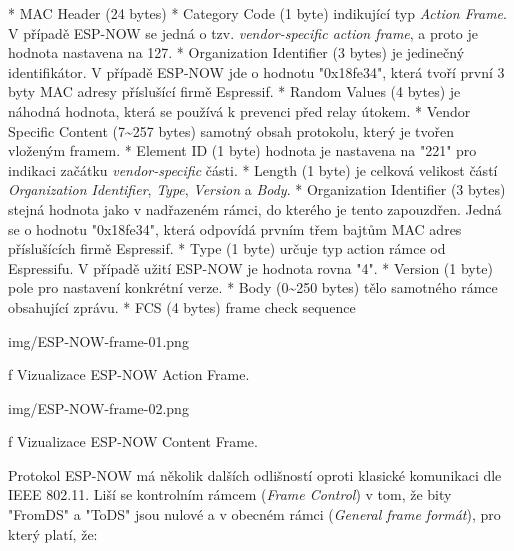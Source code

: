 \begitems
* {\sbf MAC Header} (24 bytes)
* {\sbf Category Code} (1 byte) indikující typ {\em Action Frame}. V případě ESP-NOW se jedná o tzv. {\em vendor-specific action frame}, a proto je hodnota nastavena na 127.
* {\sbf Organization Identifier} (3 bytes) je jedinečný identifikátor. V případě ESP-NOW jde o hodnotu "0x18fe34", která tvoří první 3 byty MAC adresy příslušící firmě Espressif.
* {\sbf Random Values} (4 bytes) je náhodná hodnota, která se používá k prevenci před relay útokem.
* {\sbf Vendor Specific Content} (7{\sim}257 bytes) samotný obsah protokolu, který je tvořen vloženým framem.
    \begitems
    * {\sbf Element ID} (1 byte) hodnota je nastavena na "221" pro indikaci začátku {\em vendor-specific} části.
    * {\sbf Length} (1 byte) je celková velikost částí {\em Organization Identifier}, {\em Type}, {\em Version} a {\em Body}.
    * {\sbf Organization Identifier} (3 bytes) stejná hodnota jako v nadřazeném rámci, do kterého je tento zapouzdřen. Jedná se o hodnotu "0x18fe34", která odpovídá prvním třem bajtům MAC adres příslušících firmě Espressif.
    * {\sbf Type} (1 byte) určuje typ action rámce od Espressifu. V případě užití ESP-NOW je hodnota rovna "4".
    * {\sbf Version} (1 byte) pole pro nastavení konkrétní verze.
    * {\sbf Body} (0{\sim}250 bytes) tělo samotného rámce obsahující zprávu.
    \enditems
* {\sbf FCS} (4 bytes) frame check sequence
\enditems

\medskip
{}
\picw=14cm \cinspic img/ESP-NOW-frame-01.png
\caption/f Vizualizace ESP-NOW Action Frame.
\medskip

\medskip
{}
\picw=14cm \cinspic img/ESP-NOW-frame-02.png
\caption/f Vizualizace ESP-NOW Content Frame.
\medskip

Protokol ESP-NOW má několik dalších odlišností oproti klasické komunikaci dle IEEE 802.11. Liší se kontrolním rámcem ({\em Frame Control}) v tom, že bity "FromDS" a "ToDS" jsou nulové a v obecném rámci ({\em General frame formát}), pro který platí, že:

